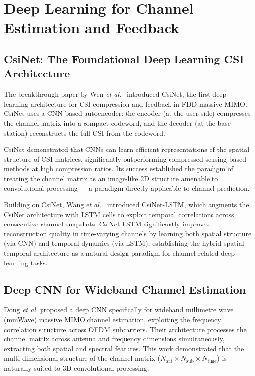 \documentclass[12pt,a4paper]{article}
\begin{document}
\section{Deep Learning for Channel Estimation and Feedback}

\subsection{CsiNet: The Foundational Deep Learning CSI Architecture}

The breakthrough paper by Wen \textit{et al.}~\cite{Wen2018csinet}
introduced CsiNet, the first deep learning architecture for CSI
compression and feedback in FDD massive MIMO. CsiNet uses a CNN-based
autoencoder: the encoder (at the user side) compresses the channel
matrix into a compact codeword, and the decoder (at the base station)
reconstructs the full CSI from the codeword.

CsiNet demonstrated that CNNs can learn efficient representations of
the spatial structure of CSI matrices, significantly outperforming
compressed sensing-based methods at high compression ratios. Its
success established the paradigm of treating the channel matrix as an
image-like 2D structure amenable to convolutional processing --- a
paradigm directly applicable to channel prediction.

Building on CsiNet, Wang \textit{et al.}~\cite{Wang2019csinetlstm}
introduced CsiNet-LSTM, which augments the CsiNet architecture with
LSTM cells to exploit temporal correlations across consecutive channel
snapshots. CsiNet-LSTM significantly improves reconstruction quality
in time-varying channels by learning both spatial structure (via CNN)
and temporal dynamics (via LSTM), establishing the hybrid
spatial-temporal architecture as a natural design paradigm for
channel-related deep learning tasks.

\subsection{Deep CNN for Wideband Channel Estimation}

Dong \textit{et al.} proposed a deep CNN specifically for wideband
millimetre wave (mmWave) massive MIMO channel estimation, exploiting
the frequency correlation structure across OFDM subcarriers. Their
architecture processes the channel matrix across antenna and frequency
dimensions simultaneously, extracting both spatial and spectral
features. This work demonstrated that the multi-dimensional structure
of the channel matrix
($N_{\mathrm{ant}} \times N_{\mathrm{sub}} \times N_{\mathrm{time}}$)
is naturally suited to 3D convolutional processing.
\end{document}
